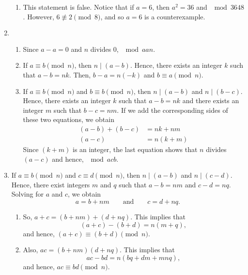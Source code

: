 \begin{enumerate}
\begin{enumerate}
\item This statement is false.  Notice that if $a = 6$, then $a^2 = 36$ and $\mod{36}{4}{8}$.  However, 
$6 \not \equiv 2 \pmod 8$, and so $a = 6$ is a counterexample.
\end{enumerate}


\item \begin{enumerate}
\item Since $a - a = 0$ and $n$ divides 0, $\mod{a}{a}{n}$.

\item If  $a \equiv b \pmod n$,  then  $n \mid ( a - b )$.  Hence, there exists an integer $k$ such that $a - b = nk$.  Then, $b - a = n ( -k )$ and $b \equiv a \pmod n$.

\item If $a \equiv b \pmod n$ and $b \equiv b \pmod n$,  then  $n \mid ( a - b )$ and $n \mid (b - c)$.  Hence, there exists an integer $k$ such that $a - b = nk$ and there exists an integer $m$ such that 
$b - c = nm$.  If we add the corresponding sides of these two equations, we obtain
\begin{align*}
(a - b) + (b - c) &= nk + nm \\
          (a - c) &= n(k + m)
\end{align*}
Since $(k + m)$ is an integer, the last equation shows that $n$ divides $(a - c)$ and hence, $\mod{a}{c}{b}$.
\end{enumerate}


\item If $a \equiv b \pmod n$ and $c \equiv d \pmod n$, then $n \mid \left( a - b \right)$ and 
$n \mid \left( c - d \right)$.  Hence, there exist integers $m$ and $q$ such that 
$a - b = nm$ and $c - d = nq$.  Solving for $a$ and $c$, we obtain
\[
a = b + nm \qquad \text{and} \qquad c = d + nq.
\]
\begin{enumerate}
\item So, $a + c = \left( b + nm \right) + \left( d + nq \right)$.  This implies that
\[
\left( a + c \right) - \left( b + d \right) = n \left( m + q \right),
\]
and hence, $\left( a + c \right) \equiv \left( b + d \right) \pmod n$.

\item Also, $ac = \left( b + nm \right) \left( d + nq \right)$.  This implies that
\[
ac - bd = n \left( bq + dm + mnq \right),
\]
and hence, $ac \equiv bd \pmod n$.
\end{enumerate}



\end{enumerate}
